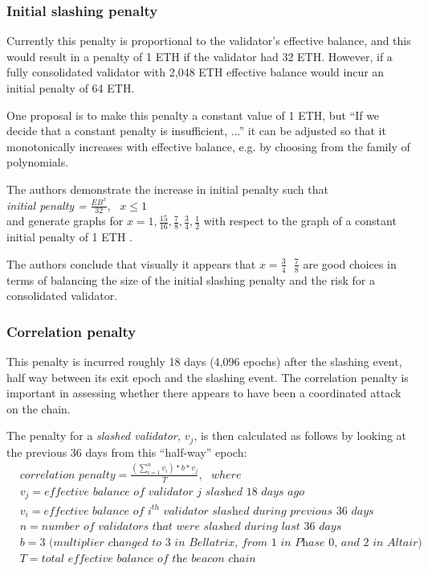 \documentclass[UTF8]{article}
\begin{document}
\subsubsection*{Initial slashing penalty}
Currently this penalty is proportional to the validator's effective balance, and this would result in a penalty of 1 ETH if the validator had 32 ETH. However, if a fully consolidated validator with 2,048 ETH effective balance would incur an initial penalty of 64 ETH.

One proposal is to make this penalty a constant value of 1 ETH, but ``If we decide that a constant penalty is insufficient, ...'' it can be adjusted so that it monotonically increases with effective balance, e.g. by choosing from the family of polynomials.


The authors demonstrate the increase in initial penalty such that \\
\textit{initial penalty =} $\frac{EB^x}{32}, \texttt{ } x \leqslant 1$ \\

and generate graphs for $x=1, \frac{15}{16}, \frac{7}{8}, \frac{3}{4}, \frac{1}{2}$ with respect to the graph of a constant initial penalty of 1 ETH \cite{Neuder2023d}.

The authors conclude that visually it appears that $x = \frac{3}{4} \texttt{ } \frac{7}{8}$ are good choices in terms of balancing the size of the initial slashing penalty and the risk for a consolidated validator.

\subsubsection*{Correlation penalty}
This penalty is incurred roughly 18 days (4,096 epochs) after the slashing event, half way between its exit epoch and the slashing event. The correlation penalty is important in assessing whether there appears to have been a coordinated attack on the chain.

The penalty for a \textit{slashed validator,} $ v_j$, is then calculated as follows by looking at the previous 36 days from this ``half-way'' epoch:
\begin{equation*}
\begin{split}
& \textit{correlation penalty} = \frac{\left( \sum_{i=1}^n v_i  \right) * b * v_j}{T}, \texttt{ } where \\
& v_j = \textit{effective balance of validator j slashed 18 days ago} \\
& v_i = \textit{effective balance of } i^{th} \textit{ validator slashed during previous 36 days} \\
& n = \textit{number of validators that were slashed during last 36 days} \\
& b =3 \textit{ (multiplier changed to 3 in Bellatrix, from 1  in Phase 0, and 2 in Altair)} \\
& T = \textit{total effective balance of the beacon chain}
\end{split}
\end{equation*}
\end{document}
